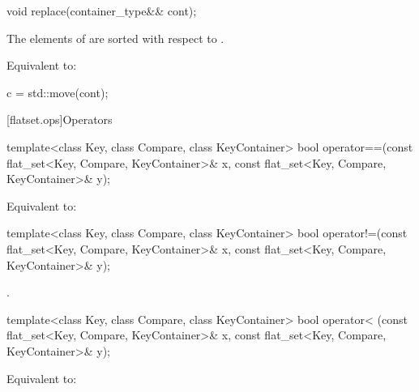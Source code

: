\begin{codeblock}
\begin{codeblock}
\begin{codeblock}
\begin{addedblock}
%
\begin{itemdecl}
void replace(container_type&& cont);
\end{itemdecl}

\begin{itemdescr}
\pnum \expects
The elements of  are sorted with respect to .

\pnum
\effects Equivalent to:
\begin{codeblock}
c = std::move(cont);
\end{codeblock}
\end{itemdescr}

[flatset.ops]{Operators}

%
\begin{itemdecl}
template<class Key, class Compare, class KeyContainer>
  bool operator==(const flat_set<Key, Compare, KeyContainer>& x,
                  const flat_set<Key, Compare, KeyContainer>& y);
\end{itemdecl}

\begin{itemdescr}
\pnum
\effects Equivalent to:
\end{itemdescr}

%
\begin{itemdecl}
template<class Key, class Compare, class KeyContainer>
  bool operator!=(const flat_set<Key, Compare, KeyContainer>& x,
                  const flat_set<Key, Compare, KeyContainer>& y);
\end{itemdecl}

\begin{itemdescr}
\pnum \returns {}.
\end{itemdescr}

%
\begin{itemdecl}
template<class Key, class Compare, class KeyContainer>
  bool operator< (const flat_set<Key, Compare, KeyContainer>& x,
                  const flat_set<Key, Compare, KeyContainer>& y);
\end{itemdecl}

\begin{itemdescr}
\pnum
\effects Equivalent to:
\end{itemdescr}


\end{addedblock}
\end{codeblock}
\end{codeblock}
\end{codeblock}
